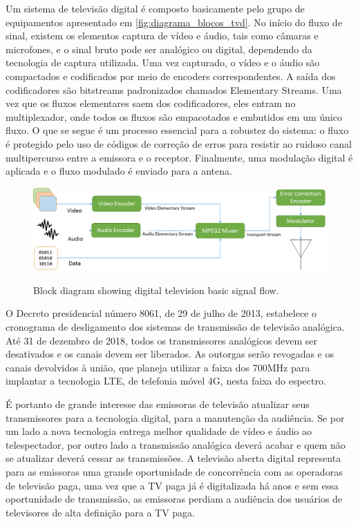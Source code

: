 \documentclass[
	12pt,				%
	oneside,			%
	a4paper,			%
	brazil
	]{abntex2}
\begin{document}
Um sistema de televisão digital é composto basicamente pelo grupo de equipamentos apresentado em \autoref{fig:diagrama_blocos_tvd}. No início do fluxo de sinal, existem os elementos captura de vídeo e áudio, tais como câmaras e microfones, e o sinal bruto pode ser analógico ou digital, dependendo da tecnologia de captura utilizada. Uma vez capturado, o vídeo e o áudio são compactados e codificados por meio de encoders correspondentes. A saída dos codificadores são bitstreams padronizados chamados Elementary Streams. Uma vez que os fluxos elementares saem dos codificadores, eles entram no multiplexador, onde todos os fluxos são empacotados e embutidos em um único fluxo. O que se segue é um processo essencial para a robustez do sistema: o fluxo é protegido pelo uso de códigos de correção de erros para resistir ao ruidoso canal multipercurso entre a emissora e o receptor. Finalmente, uma modulação digital é aplicada e o fluxo modulado é enviado para a antena.
 
 \begin{figure}[!h]
\centering
\caption{Block diagram showing digital television basic signal flow.}
\includegraphics[width=1\linewidth]{figuras/diagrama_blocos_tvd.png}
\label{fig:diagrama_blocos_tvd}
\end{figure}
 
O Decreto presidencial número 8061, de 29 de julho de 2013, estabelece o cronograma de desligamento dos sistemas de transmissão de televisão analógica. Até 31 de dezembro de 2018, todos os transmissores analógicos devem ser desativados e os canais devem ser liberados. As outorgas serão revogadas e os canais devolvidos à união, que planeja utilizar a faixa dos 700MHz para implantar a tecnologia LTE, de telefonia móvel 4G, nesta faixa do espectro.

É portanto de grande interesse das emissoras de televisão atualizar seus transmissores para a tecnologia digital, para a manutenção da audiência. Se por um lado a nova tecnologia entrega melhor qualidade de vídeo e áudio ao telespectador, por outro lado a transmissão analógica deverá acabar e quem não se atualizar deverá cessar as transmissões. A televisão aberta digital representa para as emissoras uma grande oportunidade de concorrência com as operadoras de televisão paga, uma vez que a TV paga já é digitalizada há anos e sem essa oportunidade de transmissão, as emissoras perdiam a audiência dos usuários de televisores de alta definição para a TV paga.
\end{document}

